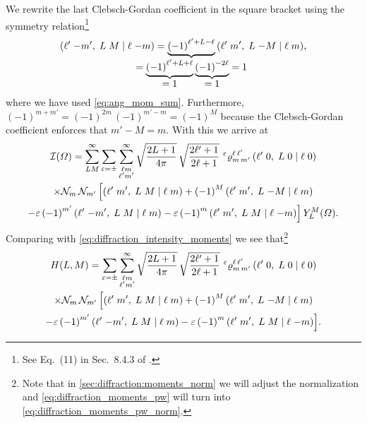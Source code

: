 We rewrite the last Clebsch-Gordan coefficient in the square bracket
using the symmetry relation\footnote{See Eq.~(11) in Sec.~8.4.3 of
.}
\begin{equation}
  \clebsch{\ell'}{-m'}{L}{M}{\ell}{-m}
  = \cdUnderbrace{{(-1)}^{\ell' + L - \ell}}{= \dUnderbrace{{(-1)}^{\ell' + L + \ell}}{= 1}\, \dUnderbrace{{(-1)}^{-2 \ell}}{= 1} = 1}\, \clebsch{\ell'}{m'}{L}{-M}{\ell}{m},
\end{equation}
where we have used \cref{eq:ang_mom_sum}.  Furthermore, ${(-1)}^{m + m'}
= {(-1)}^{2m}\, {(-1)}^{m' - m} = {(-1)}^M$ because the Clebsch-Gordan
coefficient enforces that $m' - M = m$.  With this we arrive at
\begin{multline}
  \mathcal{I}(\Omega)
  = \sum_{L M}^\infty \sum_{\varepsilon = \pm} \sum_{\substack{\ell m \\ \ell' m'}}^\infty
    \sqrt{\frac{2 L + 1}{4 \pi}}\, \sqrt{\frac{2 \ell' + 1}{2 \ell + 1}}\,
    \prescript{\ensuremath{\varepsilon}}{}{\varrho}^{\ell\, \ell'}_{m\, m'}\, ({\ell'}\;{0},\;{L}\;{0}\; |\; {\ell}\;{0}) \\
    \times \mathcal{N}_m\, \mathcal{N}_{m'}\, \Big[
      ({\ell'}\;{m'},\;{L}\;{M}\; |\; {\ell}\;{m})
      + {(-1)}^M\, ({\ell'}\;{m'},\;{L}\;{-M}\; |\; {\ell}\;{m}) \\
      - \varepsilon\, {(-1)}^{m'}\, ({\ell'}\;{-m'},\;{L}\;{M}\; |\; {\ell}\;{m})
      - \varepsilon\, {(-1)}^m\, ({\ell'}\;{m'},\;{L}\;{M}\; |\; {\ell}\;{-m}) \Big]\,
    Y_L^M(\Omega).
\end{multline}
Comparing with \cref{eq:diffraction_intensity_moments} we see
that\footnote{Note that in \cref{sec:diffraction:moments_norm} we will
adjust the normalization and \cref{eq:diffraction_moments_pw} will
turn into \cref{eq:diffraction_moments_pw_norm}.}
\begin{multline}
  \label{eq:diffraction_moments_pw}
  H(L, M)
  = \sum_{\varepsilon = \pm} \sum_{\substack{\ell m \\ \ell' m'}}^\infty
    \sqrt{\frac{2 L + 1}{4 \pi}}\, \sqrt{\frac{2 \ell' + 1}{2 \ell + 1}}\,
    \prescript{\ensuremath{\varepsilon}}{}{\varrho}^{\ell\, \ell'}_{m\, m'}\, ({\ell'}\;{0},\;{L}\;{0}\; |\; {\ell}\;{0}) \\
    \times \mathcal{N}_m\, \mathcal{N}_{m'}\, \Big[
      ({\ell'}\;{m'},\;{L}\;{M}\; |\; {\ell}\;{m})
      + {(-1)}^M\, ({\ell'}\;{m'},\;{L}\;{-M}\; |\; {\ell}\;{m}) \\
      - \varepsilon\, {(-1)}^{m'}\, ({\ell'}\;{-m'},\;{L}\;{M}\; |\; {\ell}\;{m})
      - \varepsilon\, {(-1)}^m\, ({\ell'}\;{m'},\;{L}\;{M}\; |\; {\ell}\;{-m}) \Big].
\end{multline}

